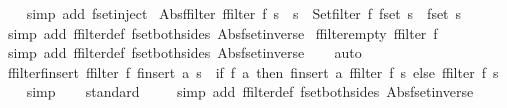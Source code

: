 \begin{isabellebody}
%
\isadelimproof
\ \ %
\endisadelimproof
%
\isatagproof
{}\isamarkupfalse%
\ {\isacharparenleft}simp\ add{\isacharcolon}\ fset{\isacharunderscore}inject{\isacharparenright}%
\endisatagproof
{\isafoldproof}%
%
\isadelimproof
\isanewline
%
\endisadelimproof
\isanewline
{}\isamarkupfalse%
\ Abs{\isacharunderscore}ffilter{\isacharcolon}\ {\isachardoublequoteopen}{\isacharparenleft}ffilter\ f\ s\ {\isacharequal}\ s{\isacharprime}{\isacharparenright}\ {\isacharequal}\ {\isacharparenleft}Set{\isachardot}filter\ f\ {\isacharparenleft}fset\ s{\isacharparenright}\ {\isacharequal}\ {\isacharparenleft}fset\ s{\isacharprime}{\isacharparenright}{\isacharparenright}{\isachardoublequoteclose}\isanewline
%
\isadelimproof
\ \ %
\endisadelimproof
%
\isatagproof
{}\isamarkupfalse%
\ {\isacharparenleft}simp\ add{\isacharcolon}\ ffilter{\isacharunderscore}def\ fset{\isacharunderscore}both{\isacharunderscore}sides\ Abs{\isacharunderscore}fset{\isacharunderscore}inverse{\isacharparenright}%
\endisatagproof
{\isafoldproof}%
%
\isadelimproof
\isanewline
%
\endisadelimproof
\isanewline
{}\isamarkupfalse%
\ ffilter{\isacharunderscore}empty{\isacharcolon}\ {\isachardoublequoteopen}ffilter\ f\ {\isacharbraceleft}{\isacharbar}{\isacharbar}{\isacharbraceright}\ {\isacharequal}\ {\isacharbraceleft}{\isacharbar}{\isacharbar}{\isacharbraceright}{\isachardoublequoteclose}\isanewline
%
\isadelimproof
\ \ %
\endisadelimproof
%
\isatagproof
{}\isamarkupfalse%
\ {\isacharparenleft}simp\ add{\isacharcolon}\ ffilter{\isacharunderscore}def\ fset{\isacharunderscore}both{\isacharunderscore}sides\ Abs{\isacharunderscore}fset{\isacharunderscore}inverse{\isacharparenright}\isanewline
\ \ \isamarkupfalse%
\ auto%
\endisatagproof
{\isafoldproof}%
%
\isadelimproof
\isanewline
%
\endisadelimproof
\isanewline
{}\isamarkupfalse%
\ ffilter{\isacharunderscore}finsert{\isacharcolon}\ {\isachardoublequoteopen}ffilter\ f\ {\isacharparenleft}finsert\ a\ s{\isacharparenright}\ {\isacharequal}\ {\isacharparenleft}if\ f\ a\ then\ finsert\ a\ {\isacharparenleft}ffilter\ f\ s{\isacharparenright}\ else\ {\isacharparenleft}ffilter\ f\ s{\isacharparenright}{\isacharparenright}{\isachardoublequoteclose}\isanewline
%
\isadelimproof
\ \ %
\endisadelimproof
%
\isatagproof
{}\isamarkupfalse%
\ simp\isanewline
\ \ \isamarkupfalse%
\ standard\isanewline
\ \ \ \isamarkupfalse%
\ {\isacharparenleft}simp\ add{\isacharcolon}\ ffilter{\isacharunderscore}def\ fset{\isacharunderscore}both{\isacharunderscore}sides\ Abs{\isacharunderscore}fset{\isacharunderscore}inverse{\isacharparenright}\isanewline

\end{isabellebody}
